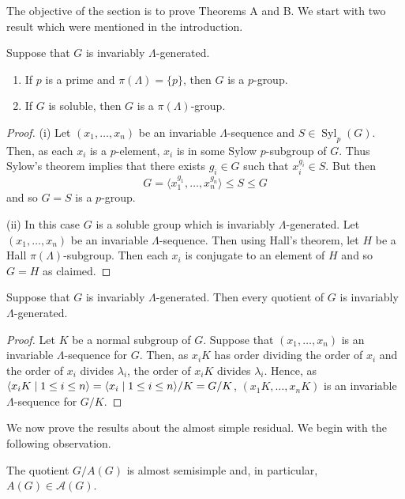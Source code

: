 \documentclass[12pt,a4paper]{amsart}
\DeclareMathOperator{\Syl}{Syl}
\DeclarePairedDelimiter{\gen}{\langle}{\rangle}
\begin{document}
 The objective of the section is to prove Theorems A and B.
 We start with two  result which were mentioned in the introduction.


\begin{lemma}\label{lem:Sylow/Hall}
Suppose that $G$ is invariably $\Lambda$-generated.
\begin{enumerate}
\item If $p$ is a prime and $\pi(\Lambda)=\{p\}$, then $G$ is a $p$-group.
\item If $G$ is soluble, then $G$ is a $\pi(\Lambda)$-group.
\end{enumerate}
\end{lemma}
\begin{proof}
 (i) Let $(x_1, \dots, x_n)$ be an invariable  $\Lambda$-sequence and $S \in \Syl_p(G)$. Then, as each $x_i$ is a $p$-element, $x_i$ is in some Sylow $p$-subgroup of $G$. Thus Sylow's theorem implies that there exists $g_i\in G$ such that $x_i^{g_i}\in S$. But then $$G= \langle x_1^{g_1},\dots,x_n^{g_n}\rangle\le S\le G$$ and so $G=S$ is a $p$-group.

(ii) In this case $G$   is a soluble group which is invariably $\Lambda$-generated. Let $(x_1, \dots, x_n)$ be an invariable  $\Lambda$-sequence. Then using Hall's theorem, let $H$ be a Hall $\pi(\Lambda)$-subgroup. Then each $x_i$ is conjugate to an element of $H$ and so $G=H$ as claimed.
 \end{proof}

\begin{lemma}\label{lem:quotients} Suppose that $G$ is invariably $\Lambda$-generated. Then every quotient of $G$ is invariably $\Lambda$-generated.
\end{lemma}

\begin{proof} Let $K$ be a normal subgroup of $G$. Suppose that $(x_1, \dots, x_n)$ is an invariable $\Lambda$-sequence for $G$. Then, as $x_iK$ has order dividing the order of $x_i$ and the order of $x_i$ divides $\lambda_i$, the order of $x_iK$ divides $\lambda_i$. Hence, as $\gen{x_iK\mid 1 \le i \le n}=\gen{x_i\mid 1 \le i \le n}/K=G/K$, $(x_1K, \dots, x_nK)$ is an invariable $\Lambda$-sequence for $G/K$.
\end{proof}


 We now prove the results about the almost simple residual. We begin with the following observation.

\begin{lemma}\label{lem:almost residual} The quotient $G/A(G)$ is almost semisimple and, in particular,
$A(G) \in \mathcal A(G)$.
\end{lemma}
\end{document}
